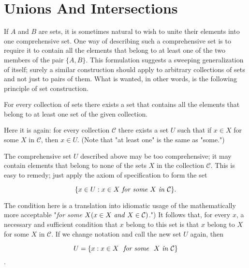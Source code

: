 
\chapter{Unions And Intersections}

If $A$ and $B$ are sets, it is sometimes natural to wish to unite their elements into one comprehensive set. One way of describing such a comprehensive set is to require it to contain all the elements that belong to at least one of the two members of the pair $ \{ A, B \}$. This formulation suggests a sweeping  generalization of itself; surely a similar construction should apply to arbitrary collections of sets and not just to pairs of them. What is wanted, in other words, is the following principle of set construction.

\begin{named}  For every collection of sets there exists a set that contains all the elements that belong to at least one set of the given collection.
\end{named}

Here it is again: for every collection $\mathcal{C}$ there exists a set $U$ such that if $x \in X$ for some $X$ in $\mathcal{C}$, then $ x \in U$. (Note that "at least one" is the same as "some.") 

The comprehensive set $U$ described above may be too comprehensive; it may contain elements that belong to none of the sets $X$ in the collection $\mathcal{C}$. This is easy to remedy; just apply the axiom of specification to form the set 

\begin{equation*}
\{ x \in U: x \in X \text{ \textit{for some} } X \text{ \textit{in} } \mathcal{C} \}.
\end{equation*}

The condition here is a translation into idiomatic usage of the mathematically more acceptable "\textit{for some} $X(x \in X \text{ \textit{and} } X \in \mathcal{C})$.") It follows that, for every $x$, a necessary and sufficient condition that $x$ belong to this set is that $x$ belong to $X$ for some $X$ in $\mathcal{C}$. If we change notation and call the new set $U$ again, then

\begin{equation*}
U = \{ x: x \in X \text{ \textit{ for some } } X \text{ \textit{in} }  \mathcal{C} \}
\end{equation*}.

